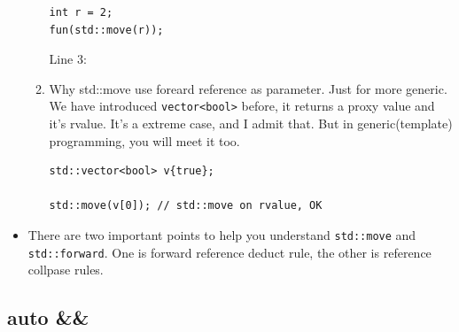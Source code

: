 \documentclass[a4paper,11pt,twoside]{book}
\begin{document}
\begin{itemize}
\begin{enumerate}
\begin{lstlisting}
int r = 2;
fun(std::move(r));
\end{lstlisting}
\begin{description}
	\item[Line 3:] 
\end{description}

    \item Why std::move use foreard reference as parameter. Just for more generic. We have introduced \texttt{vector<bool>} before, it returns a proxy value and it's rvalue. It's a extreme case, and I admit that. But in generic(template) programming, you will meet it too.
\begin{lstlisting}[]
std::vector<bool> v{true};

std::move(v[0]); // std::move on rvalue, OK
\end{lstlisting}
        \end{enumerate}
    \item There are two important points to help you understand \texttt{std::move} and \texttt{std::forward}. One is forward reference deduct rule, the other is reference collpase rules.
\end{itemize}


\subsection{auto \&\&}
\end{document}

